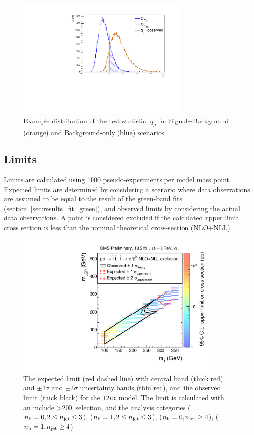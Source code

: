 \begin{figure}[t]
  \centering
  \includegraphics[width=0.75\textwidth]{Figs/other_limits/cartoon_cls_obs.pdf}
  \caption{Example distribution of the test statistic, $q_{\mu}$ for
  Signal+Background (orange) and Background-only (blue) scenarios.}
  \label{fig:cartoon_cls_obs}
\end{figure}

\subsection{Limits}
Limits are calculated using 1000 pseudo-experiments per model mass point.
Expected limits are determined by considering a scenario where data observations
are assumed to be equal to the result of the green-band fits
(section~\ref{sec:results_fit_green}), and observed
limits by considering the actual data observations.
A point is considered excluded if the calculated upper limit cross section is
less than the nominal theoretical cross-section (NLO+NLL).

\begin{figure}[h!]
\centering
\includegraphics[width=0.9\textwidth]{Figs/sms/t2cc/limit_v0/T2cc_toys_XSEC.pdf}
\caption{The expected limit (red dashed line) with central band (thick red)
and $\pm1\sigma$ and $\pm2\sigma$ uncertainty bands (thin red), and the
observed limit (thick black) for the \texttt{T2cc} model. The limit is
calculated with an include \HT>200~\gev selection, and the analysis categories 
($n_{\text{b}} = 0, 2\leq n_{\text{jet}}\leq3$), ($n_{\text{b}} = 1, 2\leq n_{\text{jet}}\leq3$), ($n_{\text{b}} = 0, n_{\text{jet}} \geq 4$), ($n_{\text{b}} = 1,
n_{\text{jet}} \geq 4$)}
\label {fig:t2cc_limit}
\end{figure}

